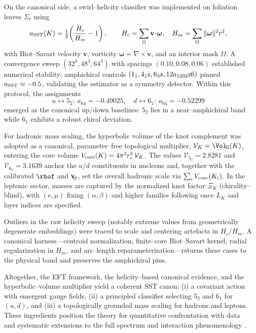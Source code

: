 \documentclass[11pt, preprint,titlepage]{revtex4-2}
\newcommand{\swirlarrow}{\!\!\scriptsize\boldsymbol{\circlearrowleft}}
\newcommand{\vswirl}{\mathbf{v}_{\swirlarrow}}
\begin{document}
    On the canonical side, a swirl–helicity classifier was implemented on foliation leaves \(\Sigma_t\) using
    \[
        a_{\rm SST}(K)=\tfrac12\!\left(\frac{H_c}{H_m}-1\right),\qquad
        H_c=\sum_{\Omega}\mathbf v\!\cdot\!\boldsymbol\omega,\quad
        H_m=\sum_{\Omega}\|\boldsymbol\omega\|^2 r^2,
    \]
    with Biot–Savart velocity \(\mathbf v\), vorticity \(\boldsymbol\omega=\nabla\times\mathbf v\), and an interior mask \(\Omega\). A convergence sweep \((32^3,48^3,64^3)\) with spacings \((0.10,0.08,0.06)\) established numerical stability; amphichiral controls \((1_1,4_1{\rm z},6_3{\rm z},12a_{1202}{\rm z6})\) pinned \(a_{\rm SST}\approx-0.5\), validating the estimator as a symmetry detector. Within this protocol, the assignments
    \[
        u \leftrightarrow 5_2:\ a_{64}=-0.49025,\quad
        d \leftrightarrow 6_1:\ a_{64}=-0.52299
    \]
    emerged as the canonical up/down baselines: \(5_2\) lies in a near–amphichiral band while \(6_1\) exhibits a robust chiral deviation.

    For hadronic mass scaling, the hyperbolic volume of the knot complement was adopted as a canonical, parameter–free topological multiplier,
    \(\mathcal{V}_K=\Vol_{\!\mathbb{H}}(K)\), entering the core volume \(V_{\rm core}(K)=4\pi^2 r_c^3\,\mathcal{V}_K\).
    The values \(\mathcal{V}_{5_2}=2.8281\) and \(\mathcal{V}_{6_1}=3.1639\) anchor the \(u/d\) constituents in nucleons and, together with the calibrated \(\rhof\) and \(\vswirl\), set the overall hadronic scale via \(\sum_i V_{\rm core}(K_i)\).
    In the leptonic sector, masses are captured by the normalized knot factor \(\Xi_K\) (chirality–blind), with \((e,\mu)\) fixing \((\alpha,\beta)\) and higher families following once \(L_K\) and layer indices are specified.

    Outliers in the raw helicity sweep (notably extreme values from geometrically degenerate embeddings) were traced to scale and centering artefacts in \(H_c/H_m\). A canonical harness—centroid normalization, finite–core Biot–Savart kernel, radial regularization in \(H_m\), and arc–length reparameterization—returns these cases to the physical band and preserves the amphichiral pins.

    Altogether, the EFT framework, the helicity–based canonical evidence, and the hyperbolic–volume multiplier yield a coherent SST canon: (i) a covariant action with emergent gauge fields, (ii) a principled classifier selecting \(5_2\) and \(6_1\) for \((u,d)\), and (iii) a topologically grounded mass scaling for hadrons and leptons. These ingredients position the theory for quantitative confrontation with data and systematic extensions to the full spectrum and interaction phenomenology \cite{Barcelo2011,Volovik2003,Faddeev1997,Arnold1998}.
\end{document}
